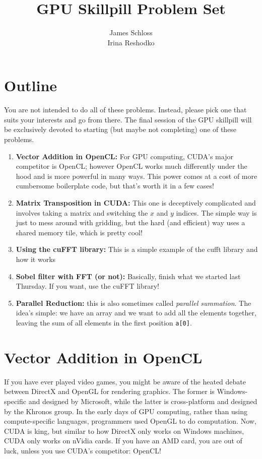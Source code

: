 \documentclass[11pt]{article}
\title{\textbf{GPU Skillpill Problem Set}}
\author{James Schloss\\
		Irina Reshodko}
\date{}
\begin{document}
\maketitle

\section*{Outline}

You are not intended to do all of these problems. Instead, please pick one that suits your interests and go from there. The final session of the GPU skillpill will be exclusively devoted to starting (but maybe not completing) one of these problems.

\begin{enumerate}
\item \textbf{Vector Addition in OpenCL:} For GPU computing, CUDA's major competitor is OpenCL; however OpenCL works much differently under the hood and is more powerful in many ways. This power comes at a cost of more cumbersome boilerplate code, but that's worth it in a few cases!
\item \textbf{Matrix Transposition in CUDA:} This one is deceptively complicated and involves taking a matrix and switching the $x$ and $y$ indices. The simple way is just to mess around with gridding, but the hard (and efficient) way uses a shared memory tile, which is pretty cool!
\item \textbf{Using the cuFFT library:} This is a simple example of the cufft library and how it works
\item \textbf{Sobel filter with FFT (or not):} Basically, finish what we started last Thursday. If you want, use the cuFFT library!
\item \textbf{Parallel Reduction:} this is also sometimes called \textit{parallel summation}. The idea's simple: we have an array and we want to add all the elements together, leaving the sum of all elements in the first position \lstinline{a[0]}.
\end{enumerate}

\newpage
\section*{Vector Addition in OpenCL}
If you have ever played video games, you might be aware of the heated debate between DirectX and OpenGL for rendering graphics. 
The former is Windows-specific and designed by Microsoft, while the latter is cross-platform and designed by the Khronos group. 
In the early days of GPU computing, rather than using compute-specific languages, programmers used OpenGL to do computation. 
Now, CUDA is king, but similar to how DirectX only works on Windows machines, CUDA only works on nVidia cards. 
If you have an AMD card, you are out of luck, unless you use CUDA's competitor: OpenCL!
\end{document}
